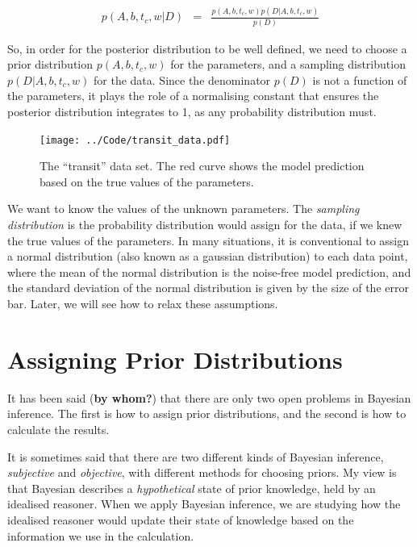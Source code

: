 \begin{eqnarray}
p(A, b, t_c, w | D) &=& \frac{p(A, b, t_c, w)p(D | A, b, t_c, w)}{p(D)}
\end{eqnarray}

So, in order for the posterior distribution to be well defined, we need to
choose a prior distribution $p(A, b, t_c, w)$ for the parameters, and a
sampling distribution $p(D | A, b, t_c, w)$ for the data. Since the denominator
$p(D)$ is not a function of the parameters, it plays the role of a normalising
constant that ensures the posterior distribution integrates to 1, as any
probability distribution must.

\begin{figure}
\begin{center}
\texttt{[image: ../Code/transit\_data.pdf]}
\caption{The ``transit'' data set. The red curve shows the model prediction
based on the true values of the parameters.\label{fig:transit_data}}
\end{center}
\end{figure}

We want to know the values of the unknown parameters.
The {\it sampling distribution} is the probability distribution would assign
for the data, if we knew the true values of the parameters.
In many situations, it is conventional to assign a normal distribution
(also known as a gaussian distribution) to each data point, where the mean
of the normal distribution is the noise-free model prediction, and the
standard deviation of the normal distribution is given by the size of the
error bar. Later, we will see how to relax these assumptions.




\section{Assigning Prior Distributions}
It has been said ({\bf by whom?}) that there are only two open problems in
Bayesian inference. The first is how to assign prior distributions, and the
second is how to calculate the results.

It is sometimes said that there are two different kinds of Bayesian inference,
{\it subjective} and {\it objective}, with different methods for choosing
priors. My view is that Bayesian describes a {\it hypothetical}
state of prior knowledge, held by an idealised reasoner. When we apply
Bayesian inference, we are studying how the idealised reasoner would update
their state of knowledge based on the information we use in the calculation.

